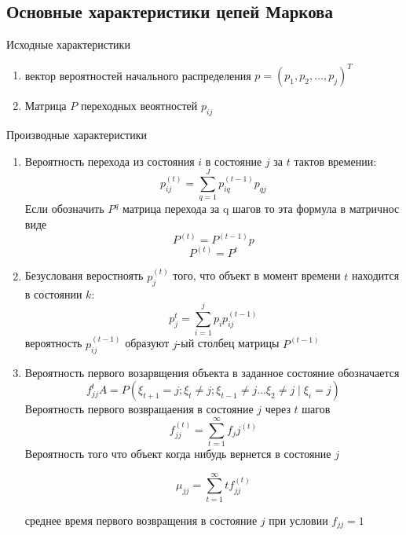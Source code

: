 \documentclass[14pt]{extarticle}
\begin{document}
\subsection{Основные характеристики цепей Маркова}
Исходные характеристики
\begin{enumerate}
	\item вектор вероятностей начального
		распределения $p = (p_1,p_2,\dots,p_{j})^{T}$
	 \item Матрица $P$ переходных веоятностей  $p_{ij}$
\end{enumerate}
Производные характеристики
\begin{enumerate}
	\item  Вероятность перехода из
		состояния $i$ в состояние  $j$ за
		 $t$ тактов времении:
		  \begin{equation}
			  p_{ij}^{(t)} = 
			  \sum_{q = 1}^{J}p_{iq}^{(t-1)} p_{qj}
		 \end{equation} 
		Если обозначить $P^{q}$ 
		матрица перехода за q
		шагов то эта формула в матричнос виде
		\begin{equation}
		P^{(t)}  =P^{(t-1)}p
		\end{equation} 
		\begin{equation}
		P^{(t)} = P^{t}
		\end{equation} 
	\item Безуслованя веростноять $p_{j}^{(t)}$ 
		того, что объект в 
		момент времени $t$ находится в состоянии  $k$:
		 \begin{equation}
		p_{j}^{t} = \sum_{i =1}^{j} p_{i} p_{ij}^{(t-1)}
		\end{equation} 
		вероятность $p_{ij}^{(t-1)}$ 
		образуют $j$-ый столбец матрицы  $P^{(t-1)}$
	\item Вероятность первого возарвщения объекта
		в заданное состояние
		обозначается
		\begin{equation}
		f^{t}_{jj}A = P\left(
		\xi_{t+1} = j; \xi_{t} \neq j;\xi_{t-1} \neq j \dots  \xi_{2} \neq j \mid \xi_{i} = j
		\right)
		\end{equation} 
		Вероятность первого возвращаения в состояние $j$ через  $t$ шагов
		\begin{equation}
		f^{(t)}_{jj} =  \sum_{t=1}^{\infty} f_jj^{(t)}
		\end{equation} 
		Вероятность того что объект когда нибудь
		вернется в состояние $j$

		 \begin{equation}
			 \mu_{jj} = \sum_{t = 1}^{\infty} t f_{jj}^{(t)}
		\end{equation} 

среднее время первого возвращения в состояние $j$ при условии  $f_{jj} = 1$
\end{enumerate}
\end{document}
